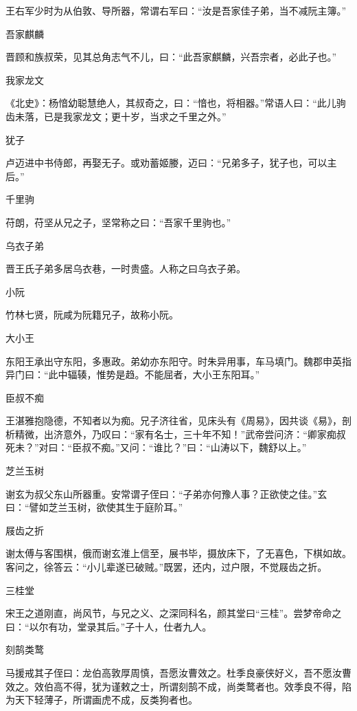 \documentclass[a4paper,12pt,UTF8,twoside]{ctexbook}
\begin{document}
    王右军少时为从伯敦、导所器，常谓右军曰：“汝是吾家佳子弟，当不减阮主簿。”
    
    吾家麒麟
    
    晋顾和族叔荣，见其总角志气不儿，曰：“此吾家麒麟，兴吾宗者，必此子也。”
    
    我家龙文
    
    《北史》：杨愔幼聪慧绝人，其叔奇之，曰：“愔也，将相器。”常语人曰：“此儿驹齿未落，已是我家龙文；更十岁，当求之千里之外。”
    
    犹子
    
    卢迈进中书侍郎，再娶无子。或劝蓄姬媵，迈曰：“兄弟多子，犹子也，可以主后。”
    
    千里驹
    
    苻朗，苻坚从兄之子，坚常称之曰：“吾家千里驹也。”
    
    乌衣子弟
    
    晋王氏子弟多居乌衣巷，一时贵盛。人称之曰乌衣子弟。
    
    小阮
    
    竹林七贤，阮咸为阮籍兄子，故称小阮。
    
    大小王
    
    东阳王承出守东阳，多惠政。弟幼亦东阳守。时朱异用事，车马填门。魏郡申英指异门曰：“此中辐辏，惟势是趋。不能屈者，大小王东阳耳。”
    
    臣叔不痴
    
    王湛雅抱隐德，不知者以为痴。兄子济往省，见床头有《周易》，因共谈《易》，剖析精微，出济意外，乃叹曰：“家有名士，三十年不知！”武帝尝问济：“卿家痴叔死未？”对曰：“臣叔不痴。”又问：“谁比？”曰：“山涛以下，魏舒以上。”
    
    芝兰玉树
    
    谢玄为叔父东山所器重。安常谓子侄曰：“子弟亦何豫人事？正欲使之佳。”玄曰：“譬如芝兰玉树，欲使其生于庭阶耳。”
    
    屐齿之折
    
    谢太傅与客围棋，俄而谢玄淮上信至，展书毕，摄放床下，了无喜色，下棋如故。客问之，徐答云：“小儿辈遂已破贼。”既罢，还内，过户限，不觉屐齿之折。
    
    三桂堂
    
    宋王之道刚直，尚风节，与兄之义、之深同科名，颜其堂曰“三桂”。尝梦帝命之曰：“以尔有功，堂录其后。”子十人，仕者九人。
    
    刻鹄类鹜
    
    马援戒其子侄曰：龙伯高敦厚周慎，吾愿汝曹效之。杜季良豪侠好义，吾不愿汝曹效之。效伯高不得，犹为谨敕之士，所谓刻鹄不成，尚类鹜者也。效季良不得，陷为天下轻薄子，所谓画虎不成，反类狗者也。
    
\end{document}
